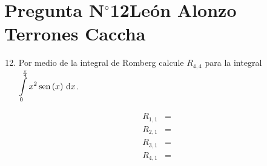 \section{Pregunta N$^{\circ}$12\qquad León Alonzo Terrones Caccha}

\begin{frame}
    \begin{enumerate}\setcounter{enumi}{11}
        \item

              Por medio de la integral de Romberg calcule $R_{4,4}$
              para la integral
              \begin{math}
                  \displaystyle
                  \int\limits_{0}^{\frac{\pi}{4}}
                  x^{2}
                  \operatorname{sen}\left(x\right)
                  \dl x
              \end{math}.
    \end{enumerate}

    \begin{solution}

        \begin{align*}
            R_{1,1} & =
            \\
            R_{2,1} & =
            \\
            R_{3,1} & =
            \\
            R_{4,1} & =
        \end{align*}
    \end{solution}
\end{frame}
